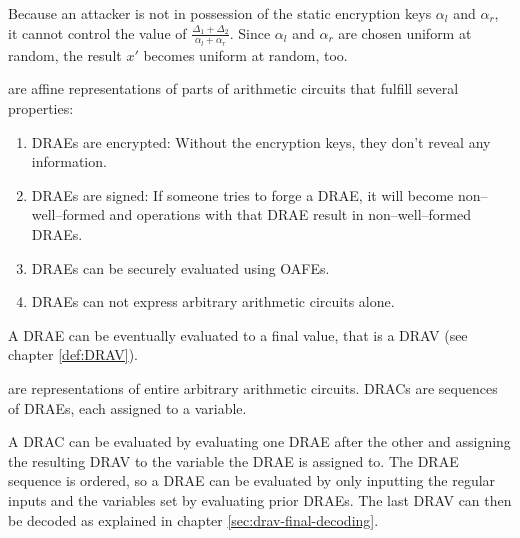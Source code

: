 Because an attacker is not in possession of the static encryption keys
$\alpha_l$ and $\alpha_r$, it cannot control the value of $\frac{\Delta_1 +
\Delta_2}{\alpha_l + \alpha_r}$. Since $\alpha_l$ and $\alpha_r$ are chosen
uniform at random, the result $x'$ becomes uniform at random, too.


%
%
\label{sec:drae}

 are affine representations of
parts of arithmetic circuits that fulfill several properties:

\begin{enumerate}

  \item \label{prop:drae-encrypted} DRAEs are encrypted: Without the encryption
    keys, they don't reveal any information.

  \item \label{prop:drae-signed} DRAEs are signed: If someone tries to forge a
    DRAE, it will become non--well--formed and operations with that DRAE result
    in non--well--formed DRAEs.

  \item \label{prop:drae-oafe} DRAEs can be securely evaluated using OAFEs.

  \item \label{prop:drae-not-enough} DRAEs can not express arbitrary arithmetic
    circuits alone.

\end{enumerate}

\noindent{}A DRAE can be eventually evaluated to a final value, that is a DRAV
(see chapter \ref{def:DRAV}).


%
%
\label{sec:drac}

 are representations of entire
arbitrary arithmetic circuits. DRACs are sequences of DRAEs, each assigned to a
variable.

\label{sec:DRAC-eval}

A DRAC can be evaluated by evaluating one DRAE after the other and assigning the
resulting DRAV to the variable the DRAE is assigned to. The DRAE sequence is
ordered, so a DRAE can be evaluated by only inputting the regular inputs
and the variables set by evaluating prior DRAEs. The last DRAV can then be
decoded as explained in chapter \ref{sec:drav-final-decoding}.


